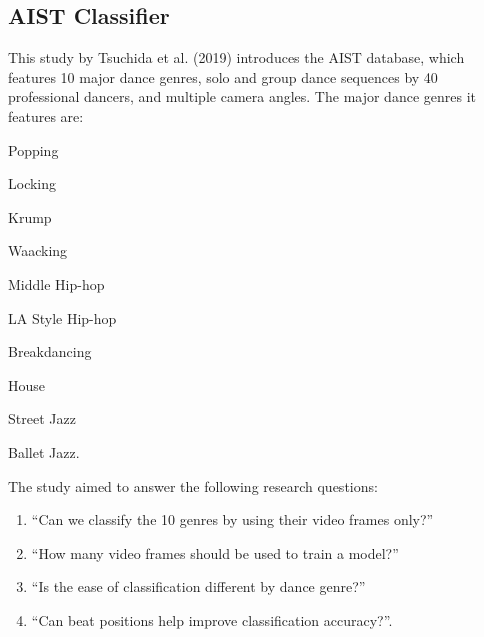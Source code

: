 \documentclass[12pt]{article}
\begin{document}
\subsection{AIST Classifier}
\noindent
\par This study by Tsuchida et al. (2019) introduces the AIST database, which features 10 major dance genres, solo and group dance sequences by 40 professional dancers, and multiple camera angles. The major dance genres it features are:
\begin{inparaenum}[i.)]\item Popping \item Locking \item Krump \item Waacking \item Middle Hip-hop \item LA Style Hip-hop \item Breakdancing \item House \item Street Jazz  \item Ballet Jazz.
\end{inparaenum} 

The study aimed to answer the following research questions:

\begin{enumerate}
    \item “Can we classify the 10 genres by using their video frames only?”
    \item “How many video frames should be used to train a model?”
    \item “Is the ease of classification different by dance genre?”
    \item “Can beat positions help improve classification accuracy?”.
\end{enumerate}
\end{document}

